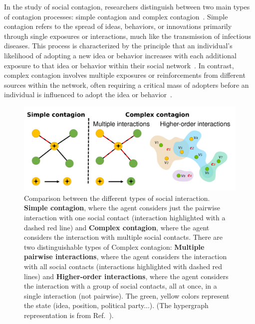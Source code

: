 In the study of social contagion, researchers distinguish between two main types of contagion processes: simple contagion and complex contagion~\cite{centola-2007}. Simple contagion refers to the spread of ideas, behaviors, or innovations primarily through single exposures or interactions, much like the transmission of infectious diseases. This process is characterized by the principle that an individual's likelihood of adopting a new idea or behavior increases with each additional exposure to that idea or behavior within their social network~\cite{christakis2007spread, fowler2009cooperative}. In contrast, complex contagion involves multiple exposures or reinforcements from different sources within the network, often requiring a critical mass of adopters before an individual is influenced to adopt the idea or behavior~\cite{granovetter-1978,centola-2007,centola-2010}.

\begin{figure}
    \centering
    \captionsetup{font=sf}
    \includegraphics[width=\textwidth]{Figs/Introduction/complex_simple.pdf}
    \caption[Simple and complex contagion processes]{Comparison between the different types of social interaction. {\bfseries Simple contagion}, where the agent considers just the pairwise interaction with one social contact (interaction highlighted with a dashed red line) and {\bfseries Complex contagion}, where the agent considers the interaction with multiple social contacts. There are two distinguishable types of Complex contagion: {\bfseries Multiple pairwise interactions}, where the agent considers the interaction with all social contacts (interactions highlighted with dashed red lines) and {\bfseries Higher-order interactions}, where the agent considers the interaction with a group of social contacts, all at once, in a single interaction (not pairwise). The green, yellow colors represent the state (idea, position, political party...). (The hypergraph representation is from Ref.~\cite{de-arruda-2020}).}
    \label{fig:SimpleComplexContagion}
\end{figure}

